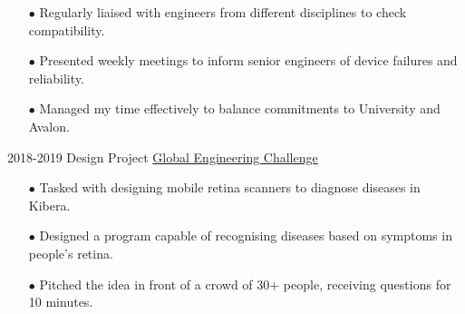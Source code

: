 \documentclass[9pt]{developercv} %
\begin{document}
\begin{entrylist}
{\begin{itemize}
				\item[$\bullet$\hspace*{0.5cm}] Regularly liaised with engineers from different disciplines to check compatibility.
				\item[$\bullet$\hspace*{0.5cm}] Presented weekly meetings to inform senior engineers of device failures and reliability.
				\item[$\bullet$\hspace*{0.5cm}] Managed my time effectively to balance commitments to University and Avalon.
			\end{itemize}		
		}
		\entry
		{2018-2019}
		{Design Project}
		{\href{https://www.sheffield.ac.uk/engineering/study/global-engineering-challenge}{Global Engineering Challenge}}
		{
			\begin{itemize}
				\item[$\bullet$\hspace*{0.5cm}] Tasked with designing mobile retina scanners to diagnose diseases in Kibera.
				\item[$\bullet$\hspace*{0.5cm}] Designed a program capable of recognising diseases based on symptoms in people's retina.
				\item[$\bullet$\hspace*{0.5cm}] Pitched the idea in front of a crowd of 30+ people, receiving questions for 10 minutes.
			\end{itemize}	
		}	
\end{entrylist}
\end{document}
